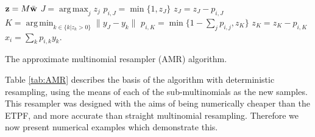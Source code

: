 \documentclass[final]{siamltex}
\renewcommand{\b}[1]{{\bf #1}}
\DeclareMathOperator*{\argmin}{arg\,min}
\DeclareMathOperator*{\argmax}{arg\,max}
\begin{document}
\begin{table}[htb]
\begin{mdframed}
\begin{algorithmic}
\STATE $\b{z} = M\bar{\b{w}}$
\STATE $J = \argmax_j z_j$
\STATE $p_{i,J} = \min\{1,z_J\}$
\STATE $z_J = z_J - p_{i,J}$
\STATE $K = \argmin_{k \in \{k|z_k>0\}} \|y_J - y_k\|$
\STATE $p_{i,K} = \min\{1-\sum_j p_{i,j}, z_K\}$
\STATE $z_K = z_K - p_{i,K}$
\ENDWHILE
\STATE $x_i = \sum_k p_{i,k}y_k$.
\ENDFOR
\end{algorithmic}
\end{mdframed}
\caption{The approximate multinomial resampler (AMR) algorithm.\label{tab:AMR}}
\end{table}

Table \ref{tab:AMR} describes the basis of the algorithm with
deterministic resampling, using the means of each of the
sub-multinomials as the new samples. This resampler was designed with the aims of being
numerically cheaper than the ETPF, and more accurate than straight multinomial
resampling. Therefore we now present numerical examples which
demonstrate this.
\end{document}
